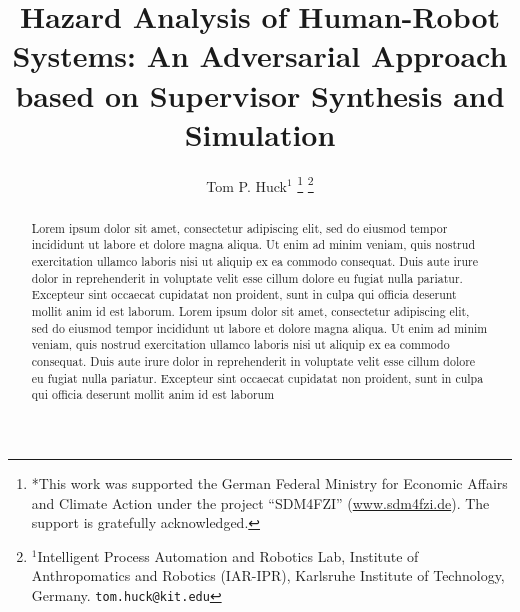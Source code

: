 \documentclass[letterpaper, 10 pt, conference]{ieeeconf}  %
\title{\LARGE \bf
Hazard Analysis of Human-Robot Systems: An Adversarial Approach based on Supervisor Synthesis and Simulation
}%
\author{Tom P. Huck$^{1}$%
\thanks{*This work was supported
the German Federal Ministry for Economic Affairs and Climate Action under the project ``SDM4FZI'' (\url{www.sdm4fzi.de}). The support is gratefully acknowledged.}%
\thanks{$^{1}$Intelligent Process Automation and Robotics Lab, Institute of Anthropomatics and Robotics (IAR-IPR), Karlsruhe Institute of Technology, Germany.
{\tt\small tom.huck@kit.edu}}%
}
\begin{document}
\maketitle
\thispagestyle{empty}
\pagestyle{empty}


\begin{abstract}
Lorem ipsum dolor sit amet, consectetur adipiscing elit, sed do eiusmod tempor incididunt ut labore et dolore magna aliqua. Ut enim ad minim veniam, quis nostrud exercitation ullamco laboris nisi ut aliquip ex ea commodo consequat. Duis aute irure dolor in reprehenderit in voluptate velit esse cillum dolore eu fugiat nulla pariatur. Excepteur sint occaecat cupidatat non proident, sunt in culpa qui officia deserunt mollit anim id est laborum. Lorem ipsum dolor sit amet, consectetur adipiscing elit, sed do eiusmod tempor incididunt ut labore et dolore magna aliqua. Ut enim ad minim veniam, quis nostrud exercitation ullamco laboris nisi ut aliquip ex ea commodo consequat. Duis aute irure dolor in reprehenderit in voluptate velit esse cillum dolore eu fugiat nulla pariatur. Excepteur sint occaecat cupidatat non proident, sunt in culpa qui officia deserunt mollit anim id est laborum
\end{abstract}

\end{document}
